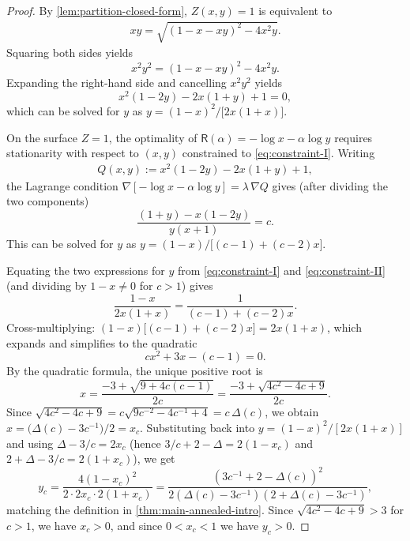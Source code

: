 \documentclass[11pt]{amsart}
\numberwithin{equation}{section}
\numberwithin{equation}{section}
\newcommand{\1}{\mathbbm{1}}
\theoremstyle{definition}
\begin{document}
\begin{proof}
    By \cref{lem:partition-closed-form},
    $Z(x,y)=1$ is equivalent to 
    \begin{align*}
        xy=\sqrt{(1-x-xy)^2-4x^2y}.
    \end{align*}
    Squaring both sides yields
    \[
    x^2y^2=(1-x-xy)^2-4x^2y.
    \]
    Expanding the right-hand side and cancelling $x^2y^2$ yields
    \begin{equation}\label{eq:constraint-I}
    x^{2}(1-2y)-2x(1+y)+1=0,\tag{I}
    \end{equation}
    which can be solved for $y$ as
    $y=(1-x)^{2}/\bigl[2x(1+x)\bigr]$.
    
    \medskip On the surface $Z=1$, the optimality of $\mathsf R(\alpha)=-\log x-\alpha\log y$ requires
    stationarity with respect to $(x,y)$ constrained to \eqref{eq:constraint-I}.
    Writing
    \begin{align*}
        Q(x,y):=x^2(1-2y)-2x(1+y)+1,
    \end{align*}
    the Lagrange condition
    $\nabla[-\log x-\alpha\log y]=\lambda\,\nabla Q$ gives (after dividing the two components)
    \begin{equation}\label{eq:constraint-II}
    \frac{(1+y)-x(1-2y)}{y(x+1)}=c.\tag{II}
    \end{equation}
    This can be solved for $y$ as $y=(1-x)/\bigl[(c-1)+(c-2)x\bigr]$.
    
    \medskip Equating the two expressions for $y$ from \eqref{eq:constraint-I} and \eqref{eq:constraint-II}
    (and dividing by $1-x\neq 0$ for $c>1$) gives
    \[
    \frac{1-x}{2x(1+x)}=\frac{1}{(c-1)+(c-2)x}.
    \]
    Cross-multiplying:
    $(1-x)\bigl[(c-1)+(c-2)x\bigr]=2x(1+x)$,
    which expands and simplifies to the quadratic
    \begin{equation}\label{eq:quadratic-x}
    cx^{2}+3x-(c-1)=0.
    \end{equation}
    By the quadratic formula, the unique positive root is
    \[
    x=\frac{-3+\sqrt{9+4c(c-1)}}{2c}=\frac{-3+\sqrt{4c^{2}-4c+9}}{2c}.
    \]
    Since $\sqrt{4c^2-4c+9}=c\sqrt{9c^{-2}-4c^{-1}+4}=c\,\Delta(c)$, we obtain
    $x=\bigl(\Delta(c)-3c^{-1}\bigr)/2=x_c$.
    Substituting back into $y=(1-x)^2/[2x(1+x)]$ and using
    $\Delta-3/c=2x_c$ (hence $3/c+2-\Delta=2(1-x_c)$ and $2+\Delta-3/c=2(1+x_c)$), we get
    \[
    y_c=\frac{4(1-x_c)^2}{2\cdot 2x_c\cdot 2(1+x_c)}
    =\frac{(3c^{-1}+2-\Delta(c))^2}{2(\Delta(c)-3c^{-1})(2+\Delta(c)-3c^{-1})},
    \]
    matching the definition in \cref{thm:main-annealed-intro}.
    Since $\sqrt{4c^2-4c+9}>3$ for $c>1$, we have $x_c>0$, and since $0<x_c<1$ we have $y_c>0$.
\end{proof}
\end{document}
